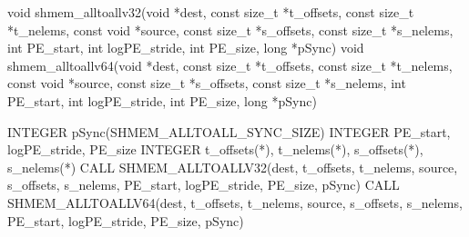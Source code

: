 
\begin{apidefinition}

\begin{Csynopsis}
void shmem_alltoallv32(void *dest, const size_t *t_offsets, const size_t *t_nelems, const void *source, const size_t *s_offsets, const size_t *s_nelems, int PE_start, int logPE_stride, int PE_size, long *pSync)
void shmem_alltoallv64(void *dest, const size_t *t_offsets, const size_t *t_nelems, const void *source, const size_t *s_offsets, const size_t *s_nelems, int PE_start, int logPE_stride, int PE_size, long *pSync)
\end{Csynopsis}

\begin{Fsynopsis}
INTEGER pSync(SHMEM_ALLTOALL_SYNC_SIZE)
INTEGER PE_start, logPE_stride, PE_size
INTEGER t_offsets(*), t_nelems(*), s_offsets(*), s_nelems(*)
CALL SHMEM_ALLTOALLV32(dest, t_offsets, t_nelems, source, s_offsets, s_nelems, PE_start, logPE_stride, PE_size, pSync)
CALL SHMEM_ALLTOALLV64(dest, t_offsets, t_nelems, source, s_offsets, s_nelems, PE_start, logPE_stride, PE_size, pSync)
\end{Fsynopsis}


\end{apidefinition}
